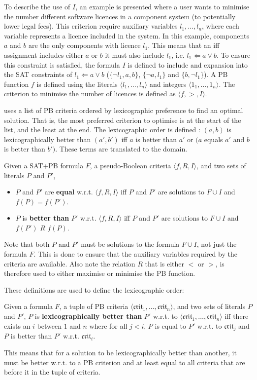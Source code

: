 To describe the use of $I$, an example is presented where a user wants to minimise the number different software licences in a component system (to potentially lower legal fees).
This criterion require  auxiliary variables $l_1,\ldots,l_n$, where each variable represents a licence included in the system.
In this example, components $a$ and $b$ are the only components with licence $l_1$.
This means that an iff assignment includes either $a$ or $b$ it must also include $l_1$, i.e. $l_1 \Leftarrow a \vee b$.
To ensure this constraint is satisfied, the formula $I$ is defined to include and expansion into the SAT constraints of $l_1 \Leftarrow a \vee b$ ($\{\neg l_1, a , b\}$, $\{\neg a , l_1\}$ 
and $\{b , \neg l_1\}$).
A PB function $f$ is defined using the literals $\langle l_1,\ldots,l_n\rangle$ and integers $\langle 1_1,\ldots,1_n\rangle$.
The criterion to minimise the number of licences is defined as $\langle f, > , I \rangle$.

\modelimpl uses a list of PB criteria ordered by lexicographic preference to find an optimal solution.
That is, the most preferred criterion to optimise is at the start of the list, and the least at the end. 
The lexicographic order is defined : $(a,b)$  is lexicographically better than $(a',b')$ iff $a$ is better than $a'$ or $(a$ equals $a'$ and $b$ is better than $b')$.
These terms are translated to the \modelimpl domain.
\begin{defs}
Given a SAT+PB formula $F$, a pseudo-Boolean criteria $\langle f,R, I \rangle$, and two sets of literals $P$ and $P'$, 
\begin{itemize}
  \item $P$ and $P'$ are \textbf{equal} w.r.t. $\langle f,R, I \rangle$ iff $P$ and $P'$ are solutions to $F \cup I$ and $f(P) = f(P')$.
  \item $P$ is \textbf{better than} $P'$ w.r.t. $\langle f,R, I \rangle$ iff $P$ and $P'$ are solutions to $F \cup I$ and $f(P')$ $R$ $f(P)$.
\end{itemize}
\end{defs}
Note that both $P$ and $P'$ must be solutions to the formula $F \cup I$, not just the formula $F$.
This is done to ensure that the auxiliary variables required by the criteria are available.
Also note the relation $R$ that is either $<$ or $>$, is therefore used to either maximise or minimise the PB function.

These definitions are used to define the lexicographic order:
\begin{defs}
Given a formula $F$, a tuple of PB criteria $\langle \mathfrak{crit}_1,\ldots,\mathfrak{crit}_n \rangle$, and two sets of literals $P$ and $P'$,
$P$ is \textbf{lexicographically better than}  $P'$ w.r.t. to $\langle \mathfrak{crit}_1,\ldots,\mathfrak{crit}_n \rangle$
iff there exists an $i$ between $1$ and $n$ where for all $j < i$, $P$ is equal to $P'$ w.r.t. to $\mathfrak{crit}_j$ and $P$ is better than $P'$ w.r.t. $\mathfrak{crit}_i$.
\end{defs}
This means that for a solution to be lexicographically better than another, 
it must be better w.r.t. to a PB criterion and at least equal to all criteria that are before it in the tuple of criteria. 

